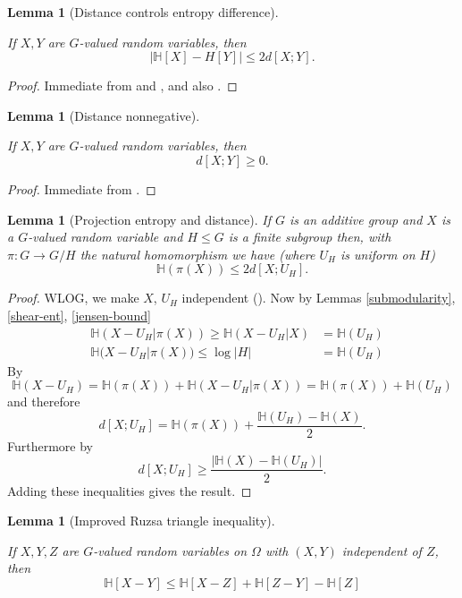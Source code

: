 \documentclass[10pt,a4paper]{article}
\newtheorem{lemma}[theorem]{Lemma}
\newcommand{\lean}[1]{}
\newcommand{\uses}[1]{}
\newcommand{\leanok}{}
\newcommand{\bbH}{\mathbb{H}}
\begin{document}
\begin{lemma}[Distance controls entropy difference]\label{ruzsa-diff}
  \uses{ruz-dist-def}
  \lean{diff_ent_le_rdist}\leanok
  If $X,Y$ are $G$-valued random variables, then
$$|\bbH[X]-H[Y]| \leq 2 d[X ;Y].$$
\end{lemma}

\begin{proof} \uses{sumset-lower, neg-ent} \leanok Immediate from  and , and also .
\end{proof}


\begin{lemma}[Distance nonnegative]\label{ruzsa-nonneg}
  \lean{rdist_nonneg}\leanok
  If $X,Y$ are $G$-valued random variables, then
  $$ d[X ;Y] \geq 0.$$
\end{lemma}

\begin{proof}
  \uses{ruzsa-diff}
  \leanok
  Immediate from .
\end{proof}


\begin{lemma}[Projection entropy and distance]\label{dist-projection}\lean{ent_of_proj_le}\leanok
If $G$ is an additive group and $X$ is a $G$-valued random variable and $H\leq G$ is a finite subgroup then, with $\pi:G\to G/H$ the natural homomorphism we have (where $U_H$ is uniform on $H$)
\[\mathbb{H}(\pi(X))\leq 2d[X;U_H].\]
\end{lemma}
\begin{proof}
\uses{independent-exist, ruzsa-diff, chain-rule, shear-ent, submodularity, jensen-bound}\leanok
WLOG, we make $X$, $U_H$ independent ().
Now by Lemmas \ref{submodularity}, \ref{shear-ent}, \ref{jensen-bound}
\begin{align*}
&\mathbb{H}(X-U_H|\pi(X)) \geq \mathbb{H}(X-U_H|X) &= \mathbb{H}(U_H) \\
&\mathbb{H}(X-U_H|\pi(X)) \leq \log |H| &= \mathbb{H}(U_H)
\end{align*}
By 
\[\mathbb{H}(X-U_H)=\mathbb{H}(\pi(X))+\mathbb{H}(X-U_H|\pi(X))=\mathbb{H}(\pi(X))+\mathbb{H}(U_H)\]
and therefore
\[d[X;U_H]=\mathbb{H}(\pi(X))+\frac{\mathbb{H}(U_H)-\mathbb{H}(X)}{2}.\]
Furthermore by 
\[d[X;U_H]\geq \frac{\lvert \mathbb{H}(X)-\mathbb{H}(U_H)\rvert}{2}.\]
Adding these inequalities gives the result.
\end{proof}

\begin{lemma}[Improved Ruzsa triangle inequality]
  \label{ruzsa-triangle-improved}
  \lean{ent_of_diff_le}
  \leanok
  If $X,Y,Z$ are $G$-valued random variables on $\Omega$ with $(X,Y)$ independent of $Z$, then
  \begin{equation}\label{submod-explicit} \bbH[X - Y] \leq \bbH[X-Z] + \bbH[Z-Y] - \bbH[Z]\end{equation}
\end{lemma}
\end{document}
